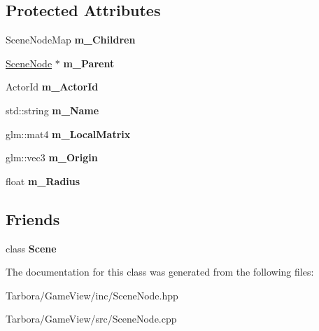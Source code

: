\subsection*{Protected Attributes}
\begin{DoxyCompactItemize}
\item 
\mbox{\label{classTarbora_1_1SceneNode_a93d3ddc66979d6e5e8c88a07cfbb8cc5}} 
Scene\+Node\+Map {\bfseries m\+\_\+\+Children}
\item 
\mbox{\label{classTarbora_1_1SceneNode_a4c1d7fd77ac18a52b388b5b95a5831e4}} 
\hyperlink{classTarbora_1_1SceneNode}{Scene\+Node} $\ast$ {\bfseries m\+\_\+\+Parent}
\item 
\mbox{\label{classTarbora_1_1SceneNode_a71c62dc00be2c6a9988edb949288ff07}} 
Actor\+Id {\bfseries m\+\_\+\+Actor\+Id}
\item 
\mbox{\label{classTarbora_1_1SceneNode_a8d0ba5c96583d5b41ad3c1fd65963e9a}} 
std\+::string {\bfseries m\+\_\+\+Name}
\item 
\mbox{\label{classTarbora_1_1SceneNode_af024c7021a33fc7188163ece9c84be83}} 
glm\+::mat4 {\bfseries m\+\_\+\+Local\+Matrix}
\item 
\mbox{\label{classTarbora_1_1SceneNode_a36c7a867f397f90ebcf8a4fe8ab7e9dd}} 
glm\+::vec3 {\bfseries m\+\_\+\+Origin}
\item 
\mbox{\label{classTarbora_1_1SceneNode_a7766c9b101fd5237cae5e98dae9e8e8a}} 
float {\bfseries m\+\_\+\+Radius}
\end{DoxyCompactItemize}
\subsection*{Friends}
\begin{DoxyCompactItemize}
\item 
\mbox{\label{classTarbora_1_1SceneNode_a032858ae1fe02d2d1170981c2af2d67c}} 
class {\bfseries Scene}
\end{DoxyCompactItemize}


The documentation for this class was generated from the following files\+:\begin{DoxyCompactItemize}
\item 
Tarbora/\+Game\+View/inc/Scene\+Node.\+hpp\item 
Tarbora/\+Game\+View/src/Scene\+Node.\+cpp\end{DoxyCompactItemize}
